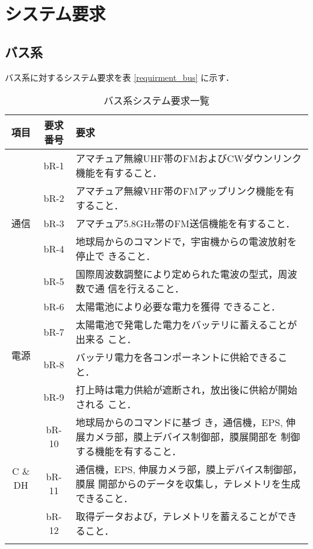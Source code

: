 \section{システム要求}





\subsection{バス系}
バス系に対するシステム要求を表 \ref{requirment_bus} に示す．

\begin{table}[htb]
    \centering
    \caption{バス系システム要求一覧}
    \begin{tabular}{|c|c|p{11cm}|} \hline
        項目 & 要求番号 & 要求 \\ \hline
        \multirow{5}{*}{通信} & bR-1 & アマチュア無線UHF帯のFMおよびCWダウンリンク機能を有すること．
        \\ \cline{2-3}
        & bR-2 & アマチュア無線VHF帯のFMアップリンク機能を有すること．
        \\ \cline{2-3}
        & bR-3 & アマチュア5.8GHz帯のFM送信機能を有すること．\\ \cline{2-3}
         & bR-4 & 地球局からのコマンドで，宇宙機からの電波放射を停止で
        きること． \\ \cline{2-3}
        & bR-5 & 国際周波数調整により定められた電波の型式，周波数で通
        信を行えること． \\ \hline
         \multirow{4}{*}{電源} & bR-6 & 太陽電池により必要な電力を獲得
         できること．\\ \cline{2-3}
        & bR-7 & 太陽電池で発電した電力をバッテリに蓄えることが出来る
         こと．  \\ \cline{2-3}
        & bR-8 & バッテリ電力を各コンポーネントに供給できること．\\ \cline{2-3}
         & bR-9 & 打上時は電力供給が遮断され，放出後に供給が開始される
         こと． \\ \hline
         \multirow{5}{*}{C \& DH} & bR-10 & 地球局からのコマンドに基づ
         き，通信機，EPS, 伸展カメラ部，膜上デバイス制御部，膜展開部を
         制御する機能を有すること．\\ \cline{2-3}
        & bR-11 & 通信機，EPS, 伸展カメラ部，膜上デバイス制御部，膜展
         開部からのデータを収集し，テレメトリを生成できること．\\ \cline{2-3}
        & bR-12 & 取得データおよび，テレメトリを蓄えることができること．\\ \cline{2-3}

\end{tabular}
\end{table}
